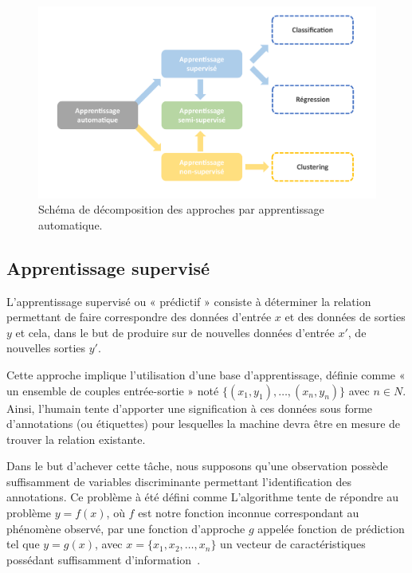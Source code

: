  \begin{figure}[H]
    \centering 
    \includegraphics[width=\linewidth]{contents/chapter_3/resources/scheme_machine_learning.pdf}
    \caption{Schéma de décomposition des approches par apprentissage automatique.}
    \label{fig:scheme_machine_learning}
\end{figure}

\subsection{Apprentissage supervisé}
\label{sec:supervised_learning}
L’apprentissage supervisé ou « prédictif » consiste à déterminer la relation permettant de faire correspondre des données d’entrée $x$ et des données de sorties $y$ et cela, dans le but de produire sur de nouvelles données d’entrée $x'$, de nouvelles sorties $y'$.\par

Cette approche implique l’utilisation d’une base d’apprentissage, définie comme « un ensemble de couples entrée-sortie » noté $\{(x_1,y_1 ),\ldots,(x_n,y_n )\}$ avec $n \in N$. Ainsi, l’humain tente d'apporter une signification à ces données sous forme d'annotations (ou étiquettes) pour lesquelles la machine devra être en mesure de trouver la relation existante.\par

Dans le but d'achever cette tâche, nous supposons qu'une observation possède suffisamment de variables discriminante permettant l'identification des annotations. Ce problème à été défini comme 
L’algorithme tente de répondre au problème $y=f(x)$, où $f$ est notre fonction inconnue correspondant au phénomène observé, par une fonction d’approche $g$ appelée fonction de prédiction tel que $y=g(x)$, avec $x=\{x_1,x_2,\ldots,x_n\}$ un vecteur de caractéristiques possédant suffisamment d'information~\cite{foulds2010}.\par 

